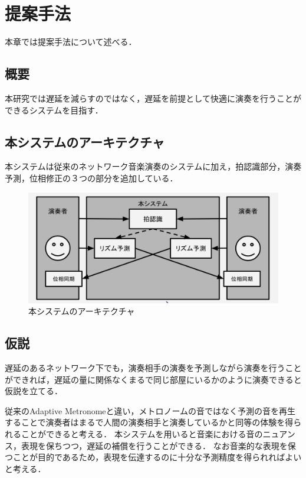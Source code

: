 \chapter{提案手法}
\label{proposed}

本章では提案手法について述べる．

\section{概要}
本研究では遅延を減らすのではなく，遅延を前提として快適に演奏を行うことができるシステムを目指す．

\section{本システムのアーキテクチャ}
本システムは従来のネットワーク音楽演奏のシステムに加え，拍認識部分，演奏予測，位相修正の３つの部分を追加している．

\begin{figure}[htbp]
  \centering
  \includegraphics[width=0.8\linewidth]{src/architecture.png}
  \caption{本システムのアーキテクチャ}
  \label{fig:architecture}
\end{figure}

\section{仮説}
遅延のあるネットワーク下でも，演奏相手の演奏を予測しながら演奏を行うことができれば，遅延の量に関係なくまるで同じ部屋にいるかのように演奏できると仮説を立てる．

従来のAdaptive Metronomeと違い，メトロノームの音ではなく予測の音を再生することで演奏者はまるで人間の演奏相手と演奏しているかと同等の体験を得られることができると考える．
本システムを用いると音楽における音のニュアンス，表現を保ちつつ，遅延の補償を行うことができる．
なお音楽的な表現を保つことが目的であるため，表現を伝達するのに十分な予測精度を得られればよいと考える．

